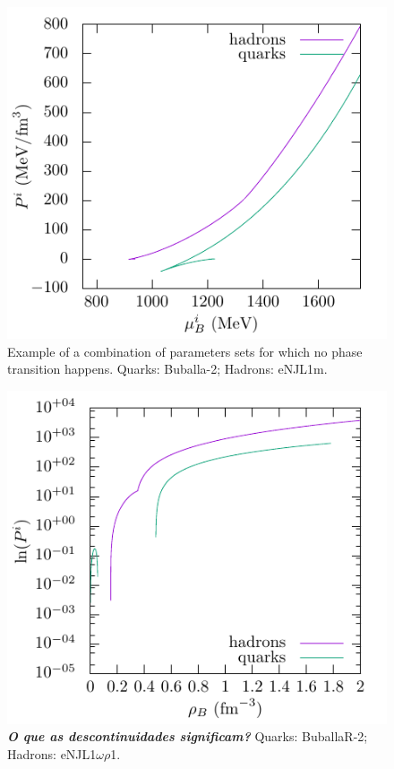 \documentclass[prc, reprint, amsmath, floatfix,10pt]{revtex4-1}
\newcommand{\comment}[1]{{\bf\textit{#1}}}
\begin{document}
\begin{figure}
	\includegraphics[width=\linewidth]{graph/Buballa_2-eNJL1m-quark-hadron_phase_transition.pdf}
	\caption{Example of a combination of parameters sets for which no phase transition happens. Quarks: Buballa-2; Hadrons: eNJL1m. \label{Fig:NoIntersection}}
\end{figure}

\begin{figure}
	\includegraphics[width=\linewidth]{graph/BuballaR_2-eNJL1OmegaRho1-quark-hadron_phase_transition2.pdf}
	\caption{\comment{O que as descontinuidades significam?} Quarks: BuballaR-2; Hadrons: eNJL1$\omega\rho$1.}
\end{figure}
\end{document}
